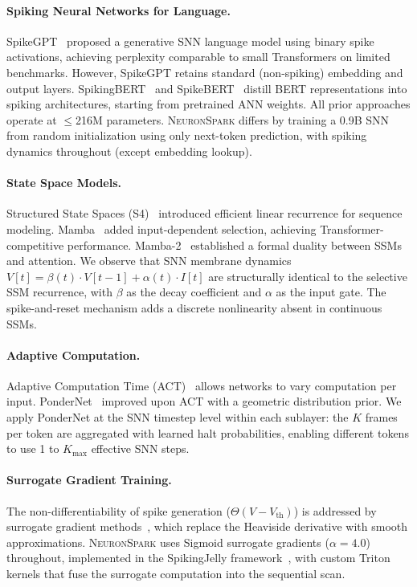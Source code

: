 \documentclass[10pt,twocolumn]{article}
\newcommand{\model}{\textsc{NeuronSpark}}
\newcommand{\vth}{V_{\text{th}}}
\begin{document}
\paragraph{Spiking Neural Networks for Language.}
SpikeGPT~\citep{zhu2024spikegpt} proposed a generative SNN language model using binary spike activations, achieving perplexity comparable to small Transformers on limited benchmarks.
However, SpikeGPT retains standard (non-spiking) embedding and output layers.
SpikingBERT~\citep{bal2024spikingbert} and SpikeBERT~\citep{lv2023spikebert} distill BERT representations into spiking architectures, starting from pretrained ANN weights.
All prior approaches operate at $\leq$216M parameters.
\model{} differs by training a 0.9B SNN from random initialization using only next-token prediction, with spiking dynamics throughout (except embedding lookup).

\paragraph{State Space Models.}
Structured State Spaces (S4)~\citep{gu2022efficiently} introduced efficient linear recurrence for sequence modeling.
Mamba~\citep{gu2024mamba} added input-dependent selection, achieving Transformer-competitive performance.
Mamba-2~\citep{dao2024transformers} established a formal duality between SSMs and attention.
We observe that SNN membrane dynamics $V[t] = \beta(t) \cdot V[t-1] + \alpha(t) \cdot I[t]$ are structurally identical to the selective SSM recurrence, with $\beta$ as the decay coefficient and $\alpha$ as the input gate.
The spike-and-reset mechanism adds a discrete nonlinearity absent in continuous SSMs.

\paragraph{Adaptive Computation.}
Adaptive Computation Time (ACT)~\citep{graves2016adaptive} allows networks to vary computation per input.
PonderNet~\citep{banino2021pondernet} improved upon ACT with a geometric distribution prior.
We apply PonderNet at the SNN timestep level within each sublayer: the $K$ frames per token are aggregated with learned halt probabilities, enabling different tokens to use 1 to $K_{\max}$ effective SNN steps.

\paragraph{Surrogate Gradient Training.}
The non-differentiability of spike generation ($\Theta(V - \vth)$) is addressed by surrogate gradient methods~\citep{neftci2019surrogate, zenke2021remarkable}, which replace the Heaviside derivative with smooth approximations.
\model{} uses Sigmoid surrogate gradients ($\alpha=4.0$) throughout, implemented in the SpikingJelly framework~\citep{fang2023spikingjelly}, with custom Triton kernels that fuse the surrogate computation into the sequential scan.
\end{document}
